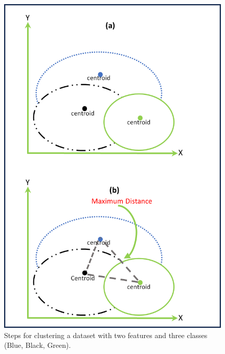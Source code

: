 \begin{figure}[!ht]
    \centering
    \begin{minipage}{0.48\textwidth}
        \centering
        \includegraphics[width=\linewidth]{5_Emerging/images/scenario1.png}
        \caption{Steps for clustering a dataset with two features and three classes (Blue, Black, Green).}
        \label{fig:scenario1}
    \end{minipage}
    \hfill
    \begin{minipage}{0.48\textwidth}
        \centering

\end{minipage}
\end{figure}
